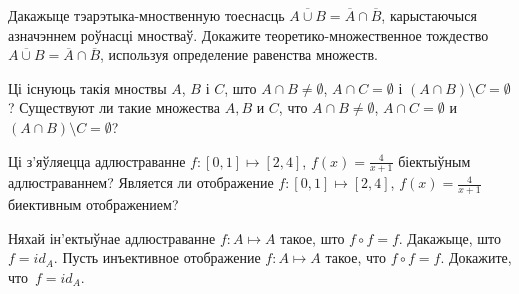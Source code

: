 \documentclass[12pt, a4paper]{article}
\begin{document}
\begin{problemList}
\bigskip

\problemItemSimple
{Дакажыце тэарэтыка-мноственную тоеснасць $\overline{A \cup B} = \overline{A} \cap \overline{B}$,
карыстаючыся азначэннем роўнасці мностваў.}
{Докажите теоретико-множественное тождество $\overline{A \cup B} = \overline{A} \cap \overline{B}$,
используя определение равенства множеств.}

\bigskip

\problemItemSimple
{Ці існуюць такія мноствы $A$, $B$ і $C$, што
$A \cap B \neq \emptyset$, $A \cap C = \emptyset$ і $(A \cap B) \setminus C = \emptyset$?}
{Существуют ли такие множества $A, B$ и $C$, что
$A \cap B \neq \emptyset$, $A \cap C = \emptyset$ и $(A \cap B) \setminus C = \emptyset$?}

\bigskip

\problemItemSimple
{Ці з'яўляецца адлюстраванне $f: [0, 1] \mapsto [2, 4]$, $f(x) = \frac{4}{x + 1}$ біектыўным адлюстраваннем?}
{Является ли отображение $f: [0, 1] \mapsto [2, 4]$, $f(x) = \frac{4}{x + 1}$ биективным отображением?}

\bigskip

\problemItemSimple
{Няхай ін'ектыўнае адлюстраванне $f: A \mapsto A$ такое, што $f \circ f = f$. Дакажыце, што~$f = id_{A}$.}
{Пусть инъективное отображение $f: A \mapsto A$ такое, что $f \circ f = f$. Докажите, что~$f = id_{A}$.}

\end{problemList}
\end{document}
